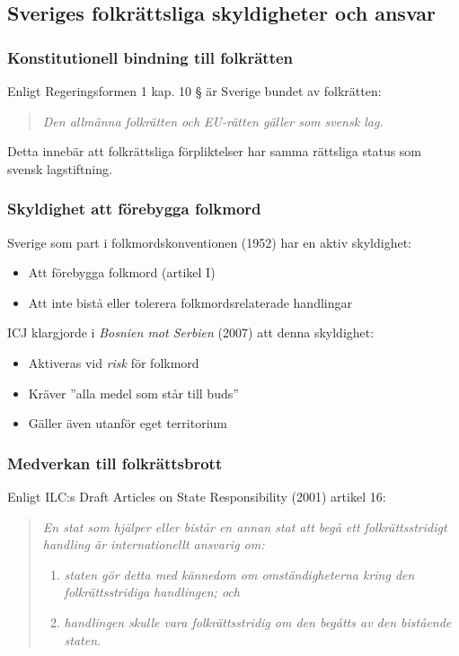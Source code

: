 

\subsection{Sveriges folkrättsliga skyldigheter och ansvar}
\label{subsec:svenska_skyldigheter}

\subsubsection{Konstitutionell bindning till folkrätten}
Enligt Regeringsformen 1 kap. 10 § är Sverige bundet av folkrätten:
\begin{quote}
\textit{Den allmänna folkrätten och EU-rätten gäller som svensk lag.}
\end{quote}
Detta innebär att folkrättsliga förpliktelser har samma rättsliga status som svensk lagstiftning.

\subsubsection{Skyldighet att förebygga folkmord}
Sverige som part i folkmordskonventionen (1952) har en aktiv skyldighet:
\begin{itemize}
\item Att förebygga folkmord (artikel I)
\item Att inte bistå eller tolerera folkmordsrelaterade handlingar
\end{itemize}
ICJ klargjorde i \textit{Bosnien mot Serbien} (2007) att denna skyldighet:
\begin{itemize}
\item Aktiveras vid \textit{risk} för folkmord
\item Kräver ”alla medel som står till buds”
\item Gäller även utanför eget territorium
\end{itemize}

\subsubsection{Medverkan till folkrättsbrott}
Enligt ILC:s Draft Articles on State Responsibility (2001) artikel 16:
\begin{quote}
\textit{En stat som hjälper eller bistår en annan stat att begå ett folkrättsstridigt handling är internationellt ansvarig om:}
\begin{enumerate}
\item \textit{staten gör detta med kännedom om omständigheterna kring den folkrättsstridiga handlingen; och}
\item \textit{handlingen skulle vara folkrättsstridig om den begåtts av den bistående staten.}
\end{enumerate}
\end{quote}

